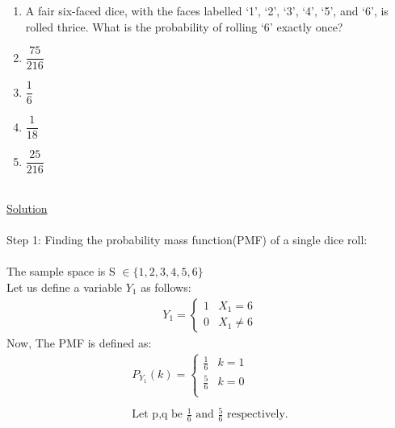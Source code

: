 \documentclass{article}
\begin{document}
 \hfill\begin{minipage}{\linewidth}
 \begin{enumerate}
    \item[Q.8] A fair six-faced dice, with the faces labelled ‘1’, ‘2’, ‘3’, ‘4’, ‘5’, and ‘6’, is rolled
    thrice. What is the probability of rolling ‘6’ exactly once?
    \item[(A)] $\dfrac{75}{216}$ 
    \item[(B)] $\dfrac{1}{6}$
    \item[(C)] $\dfrac{1}{18}$
    \item[(D)] $\dfrac{25}{216}$
\end{enumerate}
\end{minipage}\bigskip\\
\underline{Solution}\\\\
     Step 1: Finding the probability mass function(PMF) of a single dice roll:\\\\
     The sample space is S $\in \{1,2,3,4,5,6\}$ \\
     Let us define a variable $Y_1$ as follows: 
     \begin{align*}
         Y_1=
            \begin{cases}
                1&X_1=6\\
                0&X_1\neq6
            \end{cases}
     \end{align*}
     Now, The PMF is defined as:\bigskip\\
        \begin{align*}
            P_{Y_1}(k)=
                \begin{cases}
                    \frac{1}{6} &  k=1 \\
                    \frac{5}{6} & k=0\\
                \end{cases}\\\\
            \text{Let p,q be $\frac{1}{6}$ and $\frac{5}{6}$ respectively.}
        \end{align*}\\
        
\end{document}
